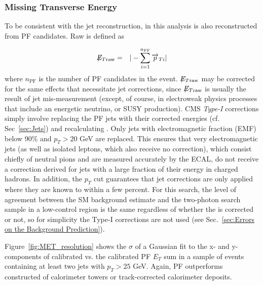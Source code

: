 \documentclass[dissertation.tex]{subfiles}
\begin{document}
\subsubsection{Missing Transverse Energy}
\label{sec:MET}

To be consistent with the jet reconstruction, \MET in this analysis is also reconstructed from PF candidates.  Raw \MET is defined as

\begin{eqnarray}
\not\!\! E_{T\mathrm{raw}} &=& |-\sum_{i = 1}^{n_{\mathrm{PF}}}\overrightarrow{p}_{Ti}|
\end{eqnarray}
%
where $n_{\mathrm{PF}}$ is the number of PF candidates in the event.  $\not\!\! E_{T\mathrm{raw}}$ may be corrected for the same effects that necessitate jet corrections, since $\not\!\! E_{T\mathrm{raw}}$ is usually the result of jet mis-measurement (except, of course, in electroweak physics processes that include an energetic neutrino, or SUSY production).  CMS \textit{Type-I} \MET corrections simply involve replacing the PF jets with their corrected energies (cf. Sec~\ref{sec:Jets}) and recalculating \MET.  Only jets with electromagnetic fraction (EMF) below 90\% and $p_{T} > 20$ GeV are replaced.  \marginpar{\textcolor{blue}{Removed italics in ``electromagnetic fraction"}}This ensures that very electromagnetic jets (as well as isolated leptons, which also receive no correction), which consist chiefly of neutral pions and are measured accurately by the ECAL, do not receive a correction derived for jets with a large fraction of their energy in charged hadrons.  In addition, the $p_{T}$ cut guarantees that jet corrections are only applied where they are known to within a few percent.  For this search, the level of agreement between the SM background estimate and the two-photon search sample in a low-\MET control region is the same regardless of whether the \MET is corrected or not, so for simplicity the Type-I \MET corrections are not used (see Sec.~\ref{sec:Errors on the Background Prediction}).

Figure~\ref{fig:MET_resolution} shows the $\sigma$ of a Gaussian fit to the x- and y-components of calibrated \MET vs. the calibrated PF $E_{T}$ sum in a sample of events containing at least two jets with $p_{T} > 25$ GeV.  Again, PF \MET outperforms \MET constructed of calorimeter towers or track-corrected calorimeter deposits.
\end{document}
